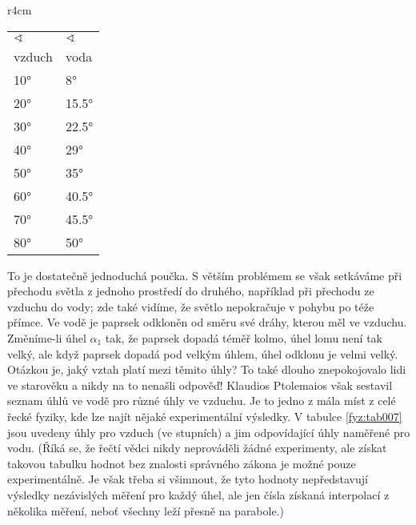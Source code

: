 {    \begin{wraptable}[21]{r}{4cm}      %
      \centering
      \renewcommand{\arraystretch}{1.4}
      \begin{tabular}{>{\centering\arraybackslash}p{3em}|>{\centering\arraybackslash}p{3em}}
         \hline \(\sphericalangle\) & \(\sphericalangle\)     \\
                    vzduch & voda         \\
         \hline   \ang{10} & \ang{8}      \\
                  \ang{20} & \ang{15.5}   \\
                  \ang{30} & \ang{22.5}   \\
                  \ang{40} & \ang{29}     \\
                  \ang{50} & \ang{35}     \\
                  \ang{60} & \ang{40.5}   \\
                  \ang{70} & \ang{45.5}   \\
                  \ang{80} & \ang{50}     \\
         \hline 
      \end{tabular}
      \caption{Ptolemaiovy hodnoty pro lom světla vzduch - voda 
               (\cite[s.~347]{Feynman01})}
      \label{fyz:tab007}
    \end{wraptable}
    To je dostatečně jednoduchá poučka. S větším problémem se však setkáváme při přechodu světla z 
    jednoho prostředí do druhého, například při přechodu ze vzduchu do vody; zde také vidíme, že 
    světlo nepokračuje v pohybu po téže přímce. Ve vodě je paprsek odkloněn od směru své dráhy, 
    kterou měl ve vzduchu. Změníme-li úhel \(\alpha_1\) tak, že paprsek dopadá téměř kolmo, úhel 
    lomu není tak velký, ale když paprsek dopadá pod velkým úhlem, úhel odklonu je velmi velký. 
    Otázkou je, jaký vztah platí mezi těmito úhly? To také dlouho znepokojovalo lidi ve starověku a 
    nikdy na to nenašli odpověď! Klaudios Ptolemaios však sestavil seznam úhlů ve vodě pro různé 
    úhly ve vzduchu. Je to jedno z mála míst z celé řecké fyziky, kde lze najít nějaké 
    experimentální výsledky. V tabulce \ref{fyz:tab007} jsou uvedeny úhly pro vzduch (ve stupních) 
    a jim odpovídající úhly naměřené pro vodu. (Říká se, že řečtí vědci nikdy neprováděli žádné 
    experimenty, ale získat takovou tabulku hodnot bez znalosti správného zákona je možné pouze 
    experimentálně. Je však třeba si všimnout, že tyto hodnoty nepředstavují výsledky nezávislých 
    měření pro každý úhel, ale jen čísla získaná interpolací z několika měření, neboť všechny leží 
    přesně na parabole.)

}
